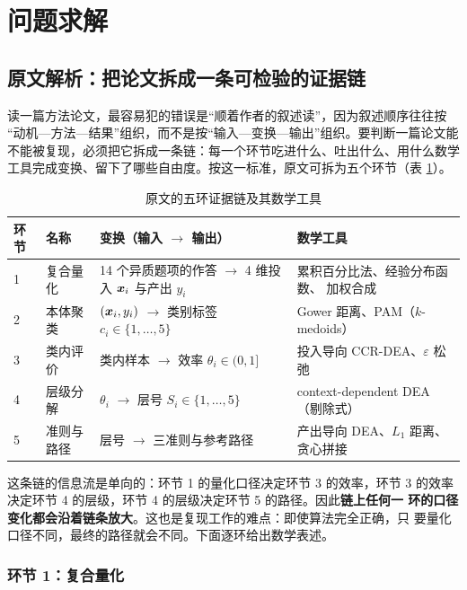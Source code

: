 \section{问题求解}

\subsection{原文解析：把论文拆成一条可检验的证据链}

读一篇方法论文，最容易犯的错误是“顺着作者的叙述读”，因为叙述顺序往往按
“动机—方法—结果”组织，而不是按“输入—变换—输出”组织。要判断一篇论文能
不能被复现，必须把它拆成一条链：每一个环节吃进什么、吐出什么、用什么数学
工具完成变换、留下了哪些自由度。按这一标准，原文可拆为五个环节（表
\ref{tab:chain}）。

\begin{table}[htbp]
\centering
\tabfont
\caption{原文的五环证据链及其数学工具}
\label{tab:chain}
\begin{tabularx}{\textwidth}{@{}p{1.0cm}p{2.4cm}Xp{4.3cm}@{}}
\toprule
环节 & 名称 & 变换（输入 $\to$ 输出） & 数学工具 \\
\midrule
1 & 复合量化 & 14 个异质题项的作答 $\to$
  4 维投入 $\bm{x}_i$ 与产出 $y_i$ & 累积百分比法、经验分布函数、
  加权合成 \\
2 & 本体聚类 & $(\bm{x}_i,y_i)$ $\to$ 类别标签 $c_i\in\{1,\dots,5\}$ &
  Gower 距离、PAM（$k$-medoids） \\
3 & 类内评价 & 类内样本 $\to$ 效率 $\theta_i\in(0,1]$ &
  投入导向 CCR-DEA、$\varepsilon$ 松弛 \\
4 & 层级分解 & $\theta_i$ $\to$ 层号 $S_i\in\{1,\dots,5\}$ &
  context-dependent DEA（剔除式） \\
5 & 准则与路径 & 层号 $\to$ 三准则与参考路径 &
  产出导向 DEA、$L_1$ 距离、贪心拼接 \\
\bottomrule
\end{tabularx}
\end{table}

这条链的信息流是单向的：环节 1 的量化口径决定环节 3 的效率，环节 3 的效率
决定环节 4 的层级，环节 4 的层级决定环节 5 的路径。因此\textbf{链上任何一
环的口径变化都会沿着链条放大}。这也是复现工作的难点：即使算法完全正确，只
要量化口径不同，最终的路径就会不同。下面逐环给出数学表述。

\subsubsection{环节 1：复合量化}

